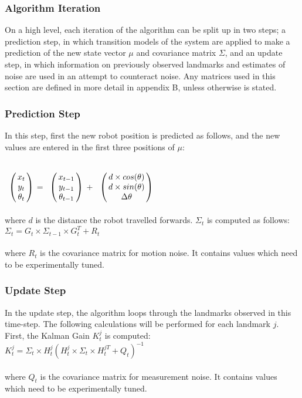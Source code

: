 \documentclass{ba-kecs}
\numberwithin{figure}{section}
\numberwithin{equation}{section}
\begin{document}
\subsubsection{Algorithm Iteration}
On a high level, each iteration of the algorithm can be split up in two steps; a prediction step, in which transition models of the system are applied to make a prediction of the new state vector $\mu$ and covariance matrix $\Sigma$, and an update step, in which information on previously observed landmarks and estimates of noise are used in an attempt to counteract noise. Any matrices used in this section are defined in more detail in appendix B, unless otherwise is stated.

\subsubsection{Prediction Step}
In this step, first the new robot position is predicted as follows, and the new values are entered in the first three positions of $\mu$:

$\bordermatrix{         & \cr
                 &x_{t} \cr
                 &y_{t} \cr
                 &\theta_{t} \cr}$
=
$\bordermatrix{         & \cr
                 &x_{t-1} \cr
                 &y_{t-1} \cr
                 &\theta_{t-1} \cr}$
+
$\bordermatrix{         & \cr
                 &d \times cos(\theta) \cr
                 &d \times sin(\theta) \cr
                 &\Delta\theta \cr}$ \\ \\
where $d$ is the distance the robot travelled forwards. $\Sigma_t$ is computed as follows: \\

$\Sigma_t = G_t \times \Sigma_{t-1} \times G_t^T + R_t$ \\ \\
where $R_t$ is the covariance matrix for motion noise. It contains values which need to be experimentally tuned.

\subsubsection{Update Step}
In the update step, the algorithm loops through the landmarks observed in this time-step. The following calculations will be performed for each landmark $j$. First, the Kalman Gain $K_t^j$ is computed: \\

$K_t^j = \Sigma_t \times H_t^j (H_t^j \times \Sigma_t \times H_t^{jT} + Q_t)^{-1}$ \\ \\
where $Q_t$ is the covariance matrix for measurement noise. It contains values which need to be experimentally tuned. 
\end{document}
